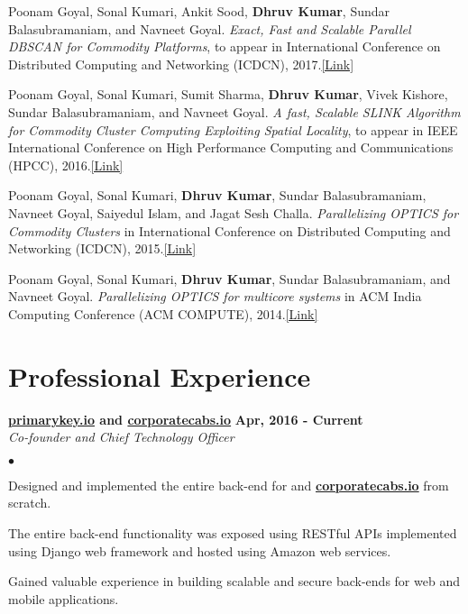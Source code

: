 \documentclass[margin,line]{res}
\newenvironment{list2}{
  \begin{list}{$\bullet$}{%
      \setlength{\itemsep}{0in}
      \setlength{\parsep}{0in} \setlength{\parskip}{0in}
      \setlength{\topsep}{0in} \setlength{\partopsep}{0in} 
      \setlength{\leftmargin}{0.2in}}}{\end{list}}
\begin{document}
\begin{resume}
Poonam Goyal, Sonal Kumari, Ankit Sood, {\bf  Dhruv Kumar}, Sundar Balasubramaniam, and Navneet
Goyal. {\it Exact, Fast and Scalable Parallel DBSCAN for Commodity Platforms}, to appear in International Conference on Distributed Computing and Networking
(ICDCN), 2017.\href{https://drive.google.com/open?id=0B5R2WFoF983oWEtOVUNCS3FUZ1E}{\color{blue}[Link]}

Poonam Goyal, Sonal Kumari, Sumit Sharma, {\bf Dhruv Kumar}, Vivek Kishore, Sundar
Balasubramaniam, and Navneet Goyal. {\it A fast, Scalable SLINK Algorithm for Commodity
Cluster Computing Exploiting Spatial Locality}, to appear in IEEE International Conference on High Performance Computing and Communications (HPCC), 2016.\href{https://drive.google.com/open?id=0B5R2WFoF983obUlHLTBTTmxsMzA}{\color{blue}[Link]}

Poonam Goyal, Sonal Kumari, {\bf Dhruv Kumar}, Sundar Balasubramaniam, Navneet Goyal, Saiyedul
Islam, and Jagat Sesh Challa. {\it Parallelizing OPTICS for Commodity Clusters} in International Conference on Distributed Computing and Networking (ICDCN), 2015.\href{http://dl.acm.org/citation.cfm?id=2684477}{\color{blue}[Link]}

Poonam Goyal, Sonal Kumari, {\bf Dhruv Kumar}, Sundar Balasubramaniam, and Navneet Goyal.  
{\it Parallelizing OPTICS for multicore systems} in ACM India Computing
Conference (ACM COMPUTE), 2014.\href{http://dl.acm.org/citation.cfm?id=2675763}{\color{blue}[Link]}

\section{\sc Professional Experience}



{\bf \href{www.primarykey.io}{primarykey.io} and \href{www.corporatecabs.io}{corporatecabs.io}} \hfill {\bf Apr, 2016 - Current}\\
{\em Co-founder and Chief Technology Officer}
\vspace{.3cm}
\begin{list2}
\item Designed and implemented the entire back-end for \href{www.primarykey.io}{\bf \color{blue}{primarykey.io}} and \href{www.corporatecabs.io}{\bf \color{blue} {corporatecabs.io}} from scratch.
\item The entire back-end functionality was exposed using RESTful APIs implemented using Django web framework and hosted using Amazon web services.
\item Gained valuable experience in building scalable and secure back-ends for web and mobile applications.
\end{list2}


\end{resume}
\end{document}
